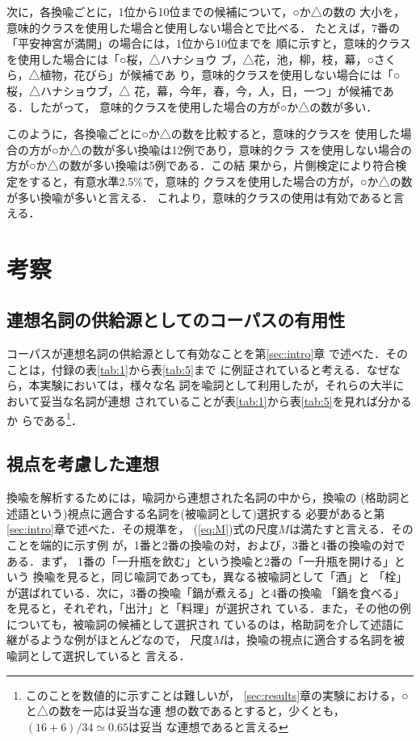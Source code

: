 次に，各換喩ごとに，1位から10位までの候補について，○か△の数の
大小を，意味的クラスを使用した場合と使用しない場合とで比べる．
たとえば，7番の「平安神宮が満開」の場合には，1位から10位までを
順に示すと，意味的クラスを使用した場合には「○桜，△ハナショウ
ブ，△花，池，柳，枝，幕，○さくら，△植物，花びら」が候補であ
り，意味的クラスを使用しない場合には「○桜，△ハナショウブ，△
花，幕，今年，春，今，人，日，一つ」が候補である．したがって，
意味的クラスを使用した場合の方が○か△の数が多い．

このように，各換喩ごとに○か△の数を比較すると，意味的クラスを
使用した場合の方が○か△の数が多い換喩は12例であり，意味的クラ
スを使用しない場合の方が○か△の数が多い換喩は5例である．この結
果から，片側検定により符合検定をすると，有意水準2.5\%で，意味的
クラスを使用した場合の方が，○か△の数が多い換喩が多いと言える．
これより，意味的クラスの使用は有効であると言える．

\section{考察}
\label{sec:discussion}

\subsection{連想名詞の供給源としてのコーパスの有用性}

コーパスが連想名詞の供給源として有効なことを第\ref{sec:intro}章
で述べた．そのことは，付録の表\ref{tab:1}から表\ref{tab:5}まで
に例証されていると考える．なぜなら，本実験においては，様々な名
詞を喩詞として利用したが，それらの大半において妥当な名詞が連想
されていることが表\ref{tab:1}から表\ref{tab:5}を見れば分かるか
らである\footnote{このことを数値的に示すことは難しいが，
  \ref{sec:results}章の実験における，○と△の数を一応は妥当な連
  想の数であるとすると，少くとも，$(16+6)/34 \simeq 0.65$は妥当
  な連想であると言える}．

\subsection{視点を考慮した連想}

換喩を解析するためには，喩詞から連想された名詞の中から，換喩の
(格助詞と述語という)視点に適合する名詞を(被喩詞として)選択する
必要があると第\ref{sec:intro}章で述べた．その規準を，
(\ref{eq:M})式の尺度$M$は満たすと言える．そのことを端的に示す例
が，1番と2番の換喩の対，および，3番と4番の換喩の対である．まず，
1番の「一升瓶を飲む」という換喩と2番の「一升瓶を開ける」という
換喩を見ると，同じ喩詞であっても，異なる被喩詞として「酒」と
「栓」が選ばれている．次に，3番の換喩「鍋が煮える」と4番の換喩
「鍋を食べる」を見ると，それぞれ，「出汁」と「料理」が選択され
ている．また，その他の例についても，被喩詞の候補として選択され
ているのは，格助詞を介して述語に継がるような例がほとんどなので，
尺度$M$は，換喩の視点に適合する名詞を被喩詞として選択していると
言える．

